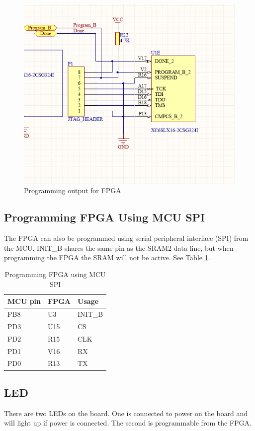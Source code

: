 \begin{figure}
    \includegraphics[width=\linewidth]{img/FPGA_Programmer}
    \caption{Programming output for FPGA}
    \label{fig:FpgaProgrammer}
\end{figure}

\subsection{Programming FPGA Using MCU SPI}
The FPGA can also be programmed using serial peripheral interface (SPI) from the MCU.
INIT\_B shares the same pin as the SRAM2 data line, but when programming the FPGA the SRAM will not be active.
See Table \ref{tab:SpiProgrammer}.

\begin{table}[]
    \centering
    \begin{tabular}{lll}
        MCU pin & FPGA & Usage   \\
        \hline
        PB8     & U3   & INIT\_B \\
        PD3     & U15  & CS      \\
        PD2     & R15  & CLK     \\
        PD1     & V16  & RX      \\
        PD0     & R13  & TX
    \end{tabular}
    \caption{Programming FPGA using MCU SPI}
    \label{tab:SpiProgrammer}
\end{table}

\subsection{LED}
There are two LEDs on the board.
One is connected to power on the board and will light up if power is connected.
The second is programmable from the FPGA.

